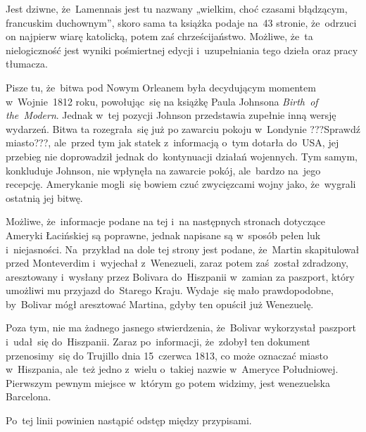 \documentclass[a4paper,11pt]{article}
\begin{document}
\noindent
{} Jest dziwne, że~Lamennais jest tu nazwany „wielkim, choć czasami
błądzącym, francuskim duchownym”, skoro sama ta książka podaje na~43
stronie, że~odrzuci on najpierw wiarę katolicką, potem zaś chrześcijaństwo.
Możliwe, że~ta nielogiczność jest wyniki pośmiertnej edycji i~uzupełniania
tego dzieła oraz pracy tłumacza.

\VerSpaceFour





\noindent
{} Pisze tu, że~bitwa pod Nowym Orleanem była decydującym momentem
w~Wojnie~1812 roku, powołując~się na książkę Paula Johnsona
\textit{Birth~of the~Modern}. Jednak w~tej pozycji Johnson przedstawia
zupełnie inną wersję wydarzeń. Bitwa ta rozegrała~się już po zawarciu
pokoju w~Londynie ???Sprawdź miasto???, ale~przed tym jak statek
z~informacją o~tym dotarła do~USA, jej przebieg nie doprowadził jednak
do~kontynuacji działań wojennych. Tym samym, konkluduje Johnson, nie
wpłynęła na zawarcie pokój, ale~bardzo na~jego recepcję. Amerykanie
mogli~się bowiem czuć zwycięzcami wojny jako, że~wygrali ostatnią jej
bitwę.

\VerSpaceFour





\noindent
{} Możliwe, że~informacje podane na tej i~na następnych stronach
dotyczące Ameryki Łacińskiej są poprawne, jednak napisane są w~sposób pełen
luk i~niejasności. Na~przykład na dole tej strony jest podane, że~Martin
skapitulował przed Monteverdim i~wyjechał z~Wenezueli, zaraz potem
zaś~został zdradzony, aresztowany i~wysłany przez Bolivara do~Hiszpanii
w~zamian za paszport, który umożliwi mu przyjazd do~Starego Kraju.
Wydaje~się mało prawdopodobne, by~Bolivar mógł aresztować Martina, gdyby
ten opuścił już Wenezuelę.

Poza tym, nie ma żadnego jasnego stwierdzenia, że~Bolivar wykorzystał
paszport i~udał~się do~Hiszpanii. Zaraz po~informacji, że~zdobył ten
dokument przenosimy~się do Trujillo dnia 15~czerwca 1813, co może
oznaczać miasto w~Hiszpania, ale~też jedno z~wielu o~takiej nazwie
w~Ameryce Południowej. Pierwszym pewnym miejsce w~którym go potem
widzimy, jest wenezuelska Barcelona.

\VerSpaceFour





\noindent
{} Po~tej linii powinien nastąpić odstęp między przypisami.

\VerSpaceFour
\end{document}
